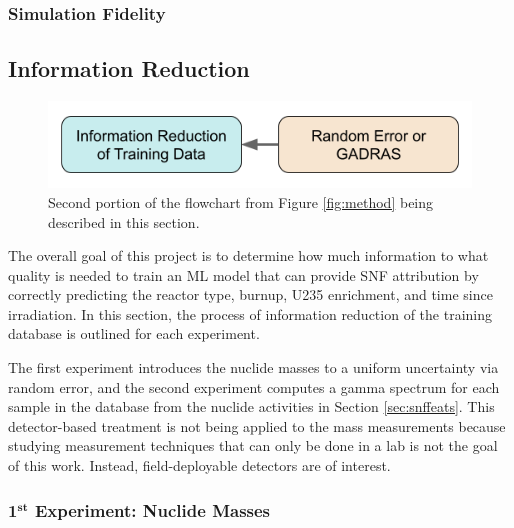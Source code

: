 \subsubsection{Simulation Fidelity}
\label{sec:fidelity}


\subsection{Information Reduction}
\label{sec:inforeduc}

\begin{figure}[H]
  \centering
  \includegraphics[width=0.7\linewidth]{./chapters/method/methodology2.png}
  \caption{Second portion of the flowchart from Figure \ref{fig:method} being 
           described in this section.}
\end{figure}

The overall goal of this project is to determine how much information to what
quality is needed to train an \gls{ML} model that can provide \gls{SNF}
attribution by correctly predicting the reactor type, burnup, \gls{U235}
enrichment, and time since irradiation.  In this section, the process of
information reduction of the training database is outlined for each experiment. 

The first experiment introduces the nuclide masses to a uniform uncertainty via
random error, and the second experiment computes a gamma spectrum for each
sample in the database from the nuclide activities in Section
\ref{sec:snffeats}.  This detector-based treatment is not being applied to the
mass measurements because studying measurement techniques that can only be done
in a lab is not the goal of this work.  Instead, field-deployable detectors are
of interest. 

\subsubsection{1$^{\mathbf{st}}$ Experiment: Nuclide Masses}
\label{sec:masserr}

